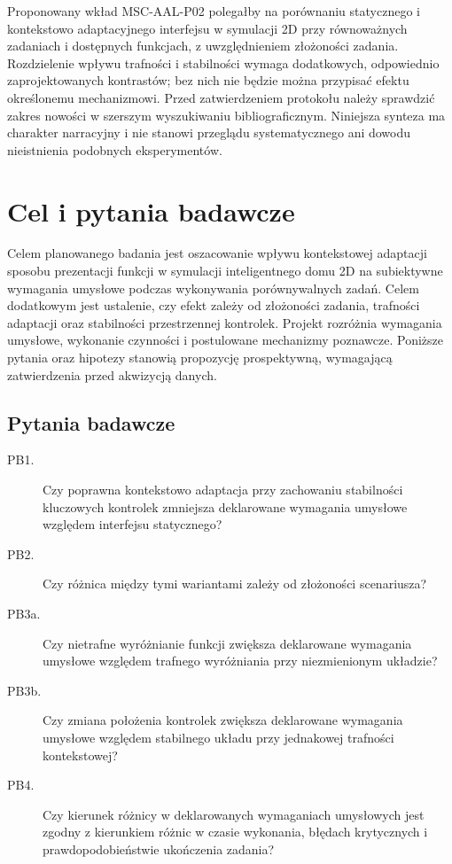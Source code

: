 \documentclass[11pt,a4paper]{article}
\begin{document}
Proponowany wkład MSC-AAL-P02 polegałby na porównaniu statycznego i kontekstowo adaptacyjnego interfejsu w symulacji 2D przy równoważnych zadaniach i dostępnych funkcjach, z uwzględnieniem złożoności zadania. Rozdzielenie wpływu trafności i stabilności wymaga dodatkowych, odpowiednio zaprojektowanych kontrastów; bez nich nie będzie można przypisać efektu określonemu mechanizmowi. Przed zatwierdzeniem protokołu należy sprawdzić zakres nowości w szerszym wyszukiwaniu bibliograficznym. Niniejsza synteza ma charakter narracyjny i nie stanowi przeglądu systematycznego ani dowodu nieistnienia podobnych eksperymentów.

\section{Cel i pytania badawcze}

Celem planowanego badania jest oszacowanie wpływu kontekstowej adaptacji sposobu prezentacji funkcji w symulacji inteligentnego domu 2D na subiektywne wymagania umysłowe podczas wykonywania porównywalnych zadań. Celem dodatkowym jest ustalenie, czy efekt zależy od złożoności zadania, trafności adaptacji oraz stabilności przestrzennej kontrolek. Projekt rozróżnia wymagania umysłowe, wykonanie czynności i postulowane mechanizmy poznawcze. Poniższe pytania oraz hipotezy stanowią propozycję prospektywną, wymagającą zatwierdzenia przed akwizycją danych.

\subsection{Pytania badawcze}

\begin{description}
\item[PB1.] Czy poprawna kontekstowo adaptacja przy zachowaniu stabilności kluczowych kontrolek zmniejsza deklarowane wymagania umysłowe względem interfejsu statycznego?
\item[PB2.] Czy różnica między tymi wariantami zależy od złożoności scenariusza?
\item[PB3a.] Czy nietrafne wyróżnianie funkcji zwiększa deklarowane wymagania umysłowe względem trafnego wyróżniania przy niezmienionym układzie?
\item[PB3b.] Czy zmiana położenia kontrolek zwiększa deklarowane wymagania umysłowe względem stabilnego układu przy jednakowej trafności kontekstowej?
\item[PB4.] Czy kierunek różnicy w deklarowanych wymaganiach umysłowych jest zgodny z kierunkiem różnic w czasie wykonania, błędach krytycznych i prawdopodobieństwie ukończenia zadania?
\end{description}
\end{document}
